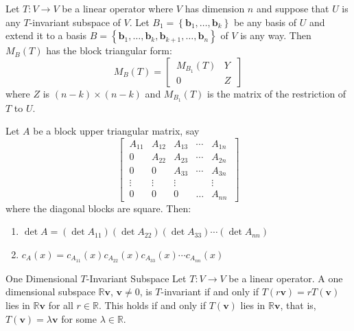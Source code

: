 \documentclass[12pt]{article}
\begin{document}
\begin{theorem}{}{}
    Let $ T : V \to V $ be a linear operator where $ V $ has dimension $ n $ and suppose that $ U $ is any $ T $-invariant subspace of $ V $. Let $ B_1 = \left\{ \mathbf{b}_1, \dots, \mathbf{b}_k \right\} $ be any basis of $ U $ and extend it to a basis $ B = \left\{ \mathbf{b}_1, \dots, \mathbf{b}_k, \mathbf{b}_{k+1}, \dots, \mathbf{b}_n \right\} $ of $ V $ is any way. Then $ M_B \left( T \right) $ has the block triangular form:
    \[ M_B \left( T \right) = \begin{bmatrix} \ M_{B_1} \left( T \right) & Y \ \\ \ 0 & Z \ \end{bmatrix} \]
    where $ Z $ is $ \left( n - k \right) \times \left( n - k \right) $ and $ M_{B_1} \left( T \right) $ is the matrix of the restriction of $ T $ to $ U $.
\end{theorem}

\begin{theorem}{}{}
    Let $ A $ be a block upper triangular matrix, say
    \[ \begin{bmatrix} \ A_{11} & A_{12} & A_{13} & \cdots & A_{1n} \ \\ \ 0 & A_{22} & A_{23} & \cdots & A_{2n} \ \\ \ 0 & 0 & A_{33} & \cdots & A_{3n} \ \\ \ \vdots & \vdots & \vdots & & \vdots \ \\ \ 0 & 0 & 0 & \dots & A_{nn} \ \end{bmatrix} \]
    where the diagonal blocks are square. Then:
    \begin{enumerate}[label=(\roman*)]
        \item $ \det A = \left( \det A_{11} \right) \left( \det A_{22} \right) \left( \det A_{33} \right) \cdots \left( \det A_{nn} \right) $
        \item $ c_A \left( x \right) = c_{A_{11}} \left( x \right) c_{A_{22}} \left( x \right) c_{A_{33}} \left( x \right) \cdots c_{A_{nn}} \left( x \right) $
    \end{enumerate}
\end{theorem}

\begin{definition}{One Dimensional $ T $-Invariant Subspace}{}
    Let $ T : V \to V $ be a linear operator. A one dimensional subspace $ \mathbb{R} \mathbf{v} $, $ \mathbf{v} \neq 0 $, is $ T $-invariant if and only if $ T \left( r \mathbf{v} \right) = r T \left( \mathbf{v} \right) $ lies in $ \mathbb{R} \mathbf{v} $ for all $ r \in \mathbb{R} $. This holds if and only if $ T \left( \mathbf{v} \right) $ lies in $ \mathbb{R} \mathbf{v} $, that is, $ T \left( \mathbf{v} \right) = \lambda \mathbf{v} $ for some $ \lambda \in \mathbb{R} $.
\end{definition}
\end{document}
